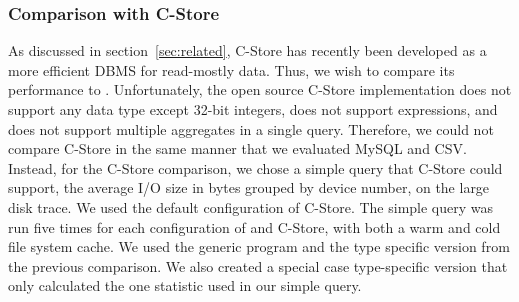 


\subsubsection{Comparison with C-Store}

As discussed in section~\ref{sec:related}, C-Store has recently been 
developed as a more efficient DBMS for read-mostly data.
Thus, we wish to compare its performance to \DataSeries{}.
Unfortunately, 
the open source C-Store implementation does not support any data type
except 32-bit integers, does not support expressions, and does not support multiple
aggregates in a single query.  Therefore, we could not compare C-Store
in the same manner that we evaluated MySQL and CSV.
Instead, for the C-Store comparison,
we chose a simple query that C-Store could support, the average I/O size in bytes grouped
by device number, on the large disk trace.
We used the default configuration of C-Store.
The simple query was run five times for each configuration of
\DataSeries{} and C-Store, with both a warm and cold file system cache.
We used the generic \DataSeries{} program and the type specific version
from the previous comparison. We also created a special case
type-specific version that only calculated the one statistic used
in our simple query.

